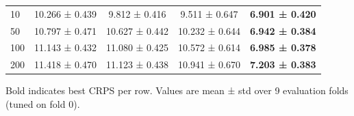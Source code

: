 \begin{table}[htbp]
{\begin{tabular}{lcccc}
10 & 10.266 ± 0.439 & 9.812 ± 0.416 & 9.511 ± 0.647 & \textbf{6.901 ± 0.420} \\
50 & 10.797 ± 0.471 & 10.627 ± 0.442 & 10.232 ± 0.644 & \textbf{6.942 ± 0.384} \\
100 & 11.143 ± 0.432 & 11.080 ± 0.425 & 10.572 ± 0.614 & \textbf{6.985 ± 0.378} \\
200 & 11.418 ± 0.470 & 11.123 ± 0.438 & 10.941 ± 0.670 & \textbf{7.203 ± 0.383} \\
\bottomrule
\end{tabular}
}%
\par\smallskip\footnotesize{Bold indicates best CRPS per row. Values are mean ± std over 9 evaluation folds (tuned on fold 0).}
\end{table}
